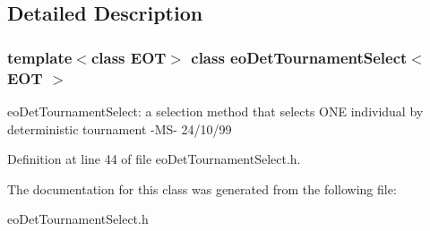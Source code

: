 \subsection{Detailed Description}
\subsubsection*{template$<$class EOT$>$ class eo\-Det\-Tournament\-Select$<$ EOT $>$}

eo\-Det\-Tournament\-Select: a selection method that selects ONE individual by deterministic tournament -MS- 24/10/99 



Definition at line 44 of file eo\-Det\-Tournament\-Select.h.

The documentation for this class was generated from the following file:\begin{CompactItemize}
\item 
eo\-Det\-Tournament\-Select.h\end{CompactItemize}
